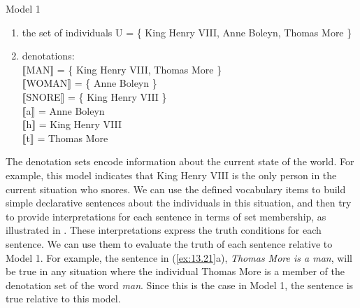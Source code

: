 \ea \label{ex:13.20}Model 1\\
\begin{enumerate}[label=\roman*.]
\item the set of individuals U = \{ King Henry VIII, Anne Boleyn, Thomas More \}
\item denotations\textsc{:\\
{}$\llbracket$}\textsc{MAN}$\rrbracket$  = \{ King Henry VIII, Thomas More \}\\
\textsc{$\llbracket$}WOMAN$\rrbracket$  = \{ Anne Boleyn \}\\
\textsc{$\llbracket$}SNORE$\rrbracket$  = \{ King Henry VIII \}\\
\textsc{$\llbracket$}a$\rrbracket$  = Anne Boleyn\\
\textsc{$\llbracket$}h$\rrbracket$  = King Henry VIII\\
\textsc{$\llbracket$}t$\rrbracket$  = Thomas More
\end{enumerate}
\z

The denotation sets encode information about the current state of the world. For example, this model indicates that King Henry VIII is the only person in the current situation who snores. We can use the defined vocabulary items to build simple declarative sentences about the individuals in this situation, and then try to provide interpretations for each sentence in terms of set membership, as illustrated in . These interpretations express the truth conditions for each sentence. We can use them to evaluate the truth of each sentence relative to Model 1. For example, the sentence in (\ref{ex:13.21}a), \textit{Thomas More is a man}, will be true in any situation where the individual Thomas More is a member of the denotation set of the word \textit{man}. Since this is the case in Model 1, the sentence is true relative to this model.



